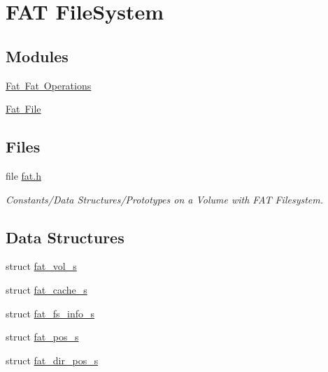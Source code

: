 \hypertarget{group__libfs__dosfs}{}\section{F\+AT File\+System}
\label{group__libfs__dosfs}
\subsection*{Modules}
\begin{DoxyCompactItemize}
\item 
\mbox{\hyperlink{group__libfs__ffo}{Fat Fat Operations}}
\item 
\mbox{\hyperlink{group__libfs__ff}{Fat File}}
\end{DoxyCompactItemize}
\subsection*{Files}
\begin{DoxyCompactItemize}
\item 
file \mbox{\hyperlink{fat_8h}{fat.\+h}}
\begin{DoxyCompactList}\small\item\em Constants/\+Data Structures/\+Prototypes on a Volume with F\+AT Filesystem. \end{DoxyCompactList}\end{DoxyCompactItemize}
\subsection*{Data Structures}
\begin{DoxyCompactItemize}
\item 
struct \mbox{\hyperlink{structfat__vol__s}{fat\+\_\+vol\+\_\+s}}
\item 
struct \mbox{\hyperlink{structfat__cache__s}{fat\+\_\+cache\+\_\+s}}
\item 
struct \mbox{\hyperlink{structfat__fs__info__s}{fat\+\_\+fs\+\_\+info\+\_\+s}}
\item 
struct \mbox{\hyperlink{structfat__pos__s}{fat\+\_\+pos\+\_\+s}}
\item 
struct \mbox{\hyperlink{structfat__dir__pos__s}{fat\+\_\+dir\+\_\+pos\+\_\+s}}
\end{DoxyCompactItemize}

